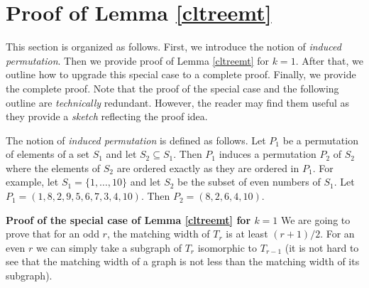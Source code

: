 \documentclass{article}
\begin{document}
\begin{comment}
According to Lemma \ref{manyass}, for any permutation of 
$SF$ of $Var(F_{r,k})$ we can find a prefix $SF_1$ and a suffix
$SF_2$ so that the assignments to $SF_1$ produce at least $2^t$
subfuncto

According to Lemma \ref{cltreemt}, the matching width
of $CT_{r,k}$ is at least $t=rk/2$.
Let $Z$ be an {\sc obdd} computing $F_{r,k}=CNF(CT_{r,k})$.
Let $SF$ be the order of $Var(F_{r,k})$ explored by $Z$.
Let $SF_1$ be a prefix of $SF$ as specified by Lemma \ref{manyass}
and let ${\bf S}$ be a set of $2^t$ assignments to $SF_1$ such that
for any $S_1,S_2 \in {\bf S}$, $F_{S_1} \neq F_{S_2}$.

Each assignment $S \in {\bf S}$ corresponds to a computational path of $Z$. 
Due to Proposition \ref{paths}, the final nodes of the computational paths are pairwise distinct. It follows that $Z$ has at least $2^t$ nodes as required. 
\end{comment}



\section{Proof of Lemma \ref{cltreemt}} \label{lbaux2}
This section is organized as follows. First, we introduce the 
notion of \emph{induced permutation}. Then we provide proof
of Lemma \ref{cltreemt} for $k=1$. After that, we outline how
to upgrade this special case to a complete proof. Finally, we provide
the complete proof. Note that the proof of the special case 
and the following outline are \emph{technically} redundant. 
However, the reader may find them useful as they provide a 
\emph{sketch} reflecting the proof idea. 

The notion of \emph{induced permutation} is defined as follows.
Let $P_1$ be a permutation of elements of a set $S_1$
and let $S_2 \subseteq S_1$. Then $P_1$ induces a permutation $P_2$ of $S_2$
where the elements of $S_2$ are ordered exactly as they are ordered in $P_1$.
For example, let $S_1=\{1, \dots, 10\}$ and let $S_2$ be the subset of even numbers
of $S_1$. Let $P_1=(1,8,2,9,5,6,7,3,4,10)$. Then $P_2=(8,2,6,4,10)$.

{\bf Proof of the special case of Lemma \ref{cltreemt} for $k=1$}
We are going to prove that for an odd $r$, the matching width of $T_r$ is at least
$(r+1)/2$. For an even $r$ we can simply take a subgraph of $T_r$
isomorphic to $T_{r-1}$ (it is not hard to see that the matching width of a graph is not 
less than the matching width of its subgraph).
\end{document}
